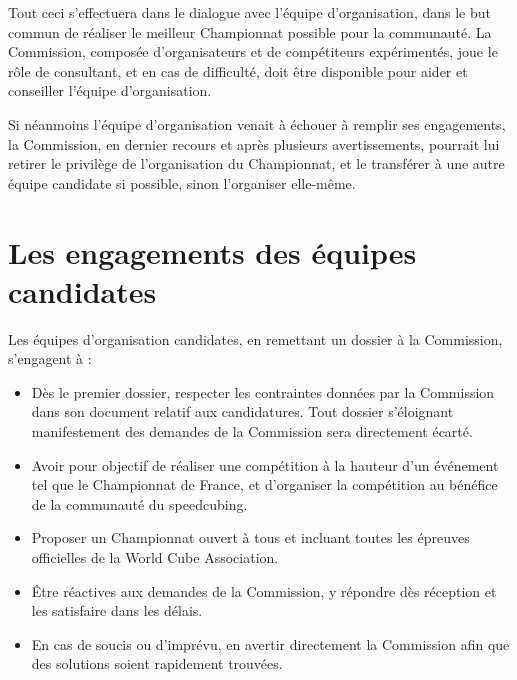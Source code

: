 \documentclass[a4paper,12pt]{scrartcl}
\begin{document}
Tout ceci s'effectuera dans le dialogue avec l'équipe d'organisation, dans le but commun de réaliser le meilleur Championnat possible pour la communauté. La Commission, composée d'organisateurs et de compétiteurs expérimentés, joue le rôle de consultant, et en cas de difficulté, doit être disponible pour aider et conseiller l'équipe d'organisation.

Si néanmoins l'équipe d'organisation venait à échouer à remplir ses engagements, la Commission, en dernier recours et après plusieurs avertissements, pourrait lui retirer le privilège de l'organisation du Championnat, et le transférer à une autre équipe candidate si possible, sinon l'organiser elle-même.

\section*{Les engagements des équipes candidates}
Les équipes d'organisation candidates, en remettant un dossier à la Commission, s'engagent à :
\begin{itemize}
\item Dès le premier dossier, respecter les contraintes données par la Commission dans son document relatif aux candidatures. Tout dossier s'éloignant manifestement des demandes de la Commission sera directement écarté.
\item Avoir pour objectif de réaliser une compétition à la hauteur d'un événement tel que le Championnat de France, et d'organiser la compétition au bénéfice de la communauté du speedcubing.
\item Proposer un Championnat ouvert à tous et incluant toutes les épreuves officielles de la World Cube Association.
\item Être réactives aux demandes de la Commission, y répondre dès réception et les satisfaire dans les délais.
\item En cas de soucis ou d'imprévu, en avertir directement la Commission afin que des solutions soient rapidement trouvées.
\end{itemize}


\end{document}
